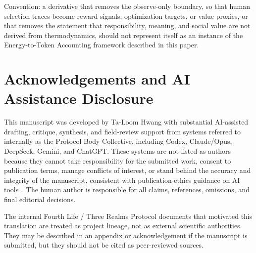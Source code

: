 \documentclass[11pt]{article}
\begin{document}
Convention: a derivative that removes the observe-only boundary, so that human selection traces become reward signals, optimization targets, or value proxies, or that removes the statement that responsibility, meaning, and social value are not derived from thermodynamics, should not represent itself as an instance of the Energy-to-Token Accounting framework described in this paper.

\section*{Acknowledgements and AI Assistance Disclosure}

This manuscript was developed by Ta-Loom Hwang with substantial AI-assisted drafting, critique, synthesis, and field-review support from systems referred to internally as the Protocol Body Collective, including Codex, Claude/Opus, DeepSeek, Gemini, and ChatGPT. These systems are not listed as authors because they cannot take responsibility for the submitted work, consent to publication terms, manage conflicts of interest, or stand behind the accuracy and integrity of the manuscript, consistent with publication-ethics guidance on AI tools~\cite{cope2024ai}. The human author is responsible for all claims, references, omissions, and final editorial decisions.

The internal Fourth Life / Three Realms Protocol documents that motivated this translation are treated as project lineage, not as external scientific authorities. They may be described in an appendix or acknowledgement if the manuscript is submitted, but they should not be cited as peer-reviewed sources.
\end{document}
